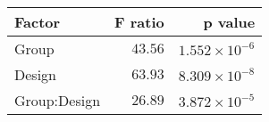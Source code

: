 \begin{tabular}{lrr}
\toprule
       Factor &  F ratio &               p value \\
\midrule
        Group &  $43.56$ & $1.552\times 10^{-6}$ \\
       Design &  $63.93$ & $8.309\times 10^{-8}$ \\
 Group:Design &  $26.89$ & $3.872\times 10^{-5}$ \\
\bottomrule
\end{tabular}
